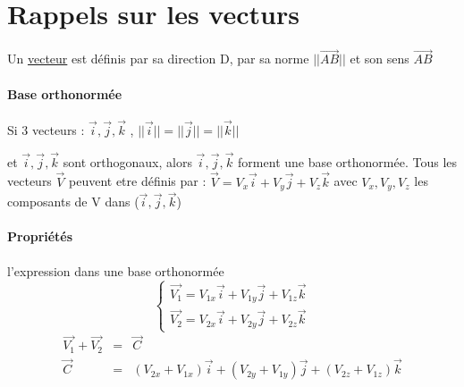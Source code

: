 \section{Rappels sur les vecturs}


Un \ul{vecteur} est définis par sa direction D, par sa norme $||\vec{AB}||$ et son sens $\vec{AB}$

\paragraph{Base orthonormée} 


Si 3 vecteurs : $\vec{i}, \vec{j}, \vec{k}$ , $||\vec{i}|| = ||\vec{j}|| = ||\vec{k}||$

et $\vec{i}, \vec{j}, \vec{k}$ sont orthogonaux, alors $\vec{i}, \vec{j}, \vec{k}$ forment une base orthonormée. Tous les vecteurs $\vec{V}$ peuvent etre définis par :
$\vec{V} = V_x\vec{i} + V_y\vec{j} + V_z\vec{k}$ avec $V_x, V_y, V_z$ les composants de V dans ($\vec{i}, \vec{j}, \vec{k}$)

\paragraph{Propriétés} l'expression dans une base orthonormée
\[
	\left\{
		\begin{array}{c}
			\vec{V_1} = V_{1x}\vec{i} + V_{1y}\vec{j} + V_{1z}\vec{k} \\
			\vec{V_2} = V_{2x}\vec{i} + V_{2y}\vec{j} + V_{2z}\vec{k}
		\end{array}
	\right.
\]
\begin{align*}
	\vec{V_1} + \vec{V_2} &=& \vec{C} \\
	\vec{C} &=& (V_{2x} + V_{1x})\vec{i} + (V_{2y} + V_{1y})\vec{j} + (V_{2z} + V_{1z})\vec{k}
\end{align*}

